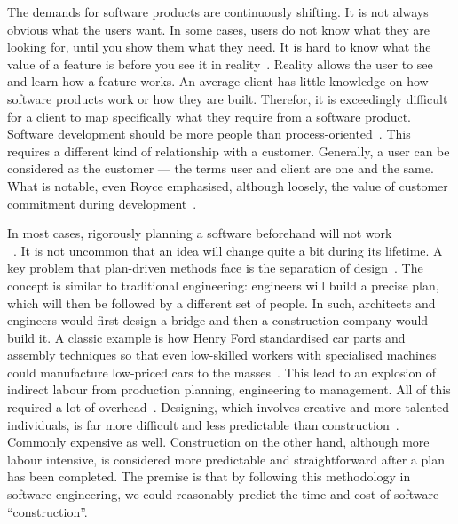 \documentclass[english]{tktltiki2}
\begin{document}
The demands for software products are continuously shifting. It is not always obvious what the users want. In some cases, users do not know what they are looking for, until you show them what they need. It is hard to know what the value of a feature is before you see it in reality~\cite{Fow05}. Reality allows the user to see and learn how a feature works. An average client has little knowledge on how software products work or how they are built. Therefor, it is exceedingly difficult for a client to map specifically what they require from a software product. Software development should be more people than process-oriented~\cite{Fow05}. This requires a different kind of relationship with a customer. Generally, a user can be considered as the customer — the terms user and client are one and the same. What is notable, even Royce emphasised, although loosely, the value of customer commitment during development~\cite{Roy70}.

In most cases, rigorously planning a software beforehand will not work\\~\cite{LB03}. It is not uncommon that an idea will change quite a bit during its lifetime. A key problem that plan-driven  methods face is the separation of design~\cite{LB03, Fow05}. The concept is similar to traditional engineering: engineers will build a precise plan, which will then be followed by a different set of people. In such, architects and engineers would first design a bridge and then a construction company would build it. A classic example is how Henry Ford standardised car parts and assembly techniques so that even low-skilled workers with specialised machines could manufacture low-priced cars to the masses~\cite{Pop02}. This lead to an explosion of indirect labour from production planning, engineering to management. All of this required a lot of overhead~\cite{Pop02}. Designing, which involves creative and more talented individuals, is far more difficult and less predictable than construction~\cite{Fow05}. Commonly expensive as well. Construction on the other hand, although more labour intensive, is considered more predictable and straightforward after a plan has been completed. The premise is that by following this methodology in software engineering, we could reasonably predict the time and cost of software “construction”.
\end{document}
